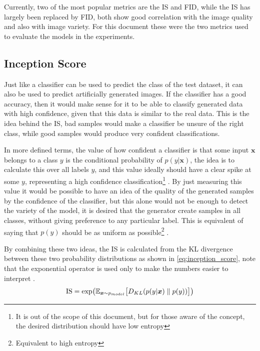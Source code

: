Currently, two of the most popular metrics are the \gls{IS} and \gls{FID}, while the \gls{IS} has largely been replaced by \gls{FID}, both show good correlation with the image quality and also with image variety. For this document these were the two metrics used to evaluate the models in the experiments.

\subsection{Inception Score}
Just like a classifier can be used to predict the class of the test dataset, it can also be used to predict artificially generated images. If the classifier has a good accuracy, then it would make sense for it to be able to classify generated data with high confidence, given that this data is similar to the real data. This is the idea behind the \gls{IS}, bad samples would make a classifier be unsure of the right class, while good samples would produce very confident classifications.

In more defined terms, the value of how confident a classifier is that some input $\bm{x}$ belongs to a class $y$ is the conditional probability of $p(y | \bm{x})$, the idea is to calculate this over all labels $y$, and this value ideally should have a clear spike at some $y$, representing a high confidence classification\footnote{
    It is out of the scope of this document, but for those aware of the concept, the desired distribution should have low entropy
} \cite{improvedGANS2016}. By just measuring this value it would be possible to have an idea of the quality of the generated samples by the confidence of the classifier, but this alone would not be enough to detect the variety of the model, it is desired that the generator create samples in all classes, without giving preference to any particular label. This is equivalent of saying that $p(y)$ should be as uniform as possible\footnote{
    Equivalent to high entropy
} \cite{coursera_IS}.

By combining these two ideas, the \gls{IS} is calculated from the KL divergence between these two probability distributions as shown in \autoref{eq:inception_score}, note that the exponential operator is used only to make the numbers easier to interpret \cite{improvedGANS2016}.
\begin{equation} \label{eq:inception_score}
    \operatorname{IS} = \exp\bigl({\mathbb{E}_{\bm{x}\sim p_{model}}{
        \bigl\lbrack D_{KL}(p(y | \bm{x}) \;\|\; p(y)) \bigr\rbrack
    }}\bigr)
\end{equation}

